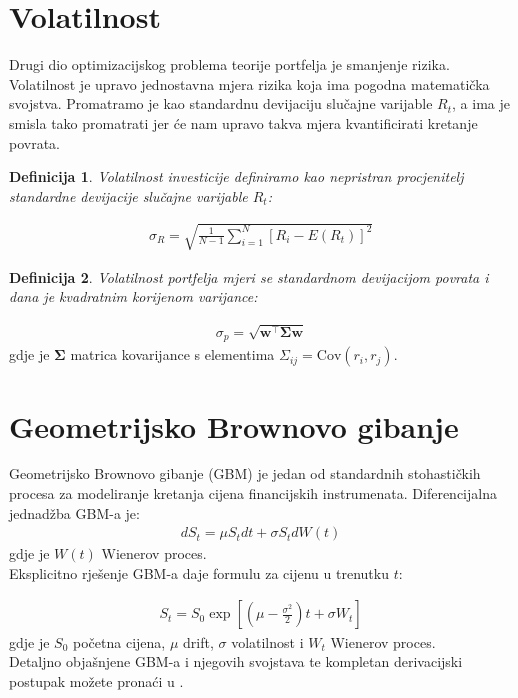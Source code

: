 \documentclass[zavrsnirad, upload]{fer}
\newtheorem{definition}{Definicija}
\begin{document}
\section{Volatilnost}
Drugi dio optimizacijskog problema teorije portfelja je smanjenje rizika.
Volatilnost je upravo jednostavna mjera rizika koja ima pogodna matematička svojstva.
Promatramo je kao standardnu devijaciju slučajne varijable $R_t$, a ima je smisla tako promatrati
jer će nam upravo takva mjera kvantificirati kretanje povrata.
\begin{definition}
	Volatilnost investicije definiramo kao nepristran procjenitelj
	standardne devijacije slučajne varijable $R_t$:
\end{definition}
\begin{align}
	\sigma_R = \sqrt{\frac{1}{N - 1} \sum_{i = 1}^{N} \left[R_i - E(R_t)\right]^2}
\end{align}
\begin{definition}
Volatilnost portfelja mjeri se standardnom devijacijom povrata i dana je kvadratnim korijenom varijance:
\end{definition}
\begin{align}
\sigma_p = \sqrt{\mathbf{w}^\intercal \boldsymbol{\Sigma} \mathbf{w}}
\end{align}
\indent gdje je $\boldsymbol{\Sigma}$ matrica kovarijance s elementima $\Sigma_{ij} = \text{Cov}(r_i, r_j)$.

\section{Geometrijsko Brownovo gibanje}
\label{sek:gbm}
Geometrijsko Brownovo gibanje (GBM) je jedan od standardnih
stohastičkih procesa za modeliranje kretanja cijena financijskih instrumenata.
Diferencijalna jednadžba GBM-a je:
\begin{align}
    dS_t = \mu S_t dt + \sigma S_t dW\left(t\right)
\end{align}
\indent gdje je $W\left(t\right)$ Wienerov proces.\\
Eksplicitno rješenje GBM-a daje formulu za cijenu u trenutku $t$:

\begin{align}
S_t = S_0 \exp\left[\left(\mu - \frac{\sigma^2}{2}\right)t +
    \sigma W_t\right] \label{eq:gbm}
\end{align}
\indent gdje je $S_0$ početna cijena, $\mu$ drift, $\sigma$ volatilnost i $W_t$
Wienerov proces.\\
Detaljno objašnjene GBM-a i njegovih svojstava te kompletan derivacijski
postupak možete pronaći u \cite{GMBIzvod}.
\end{document}
